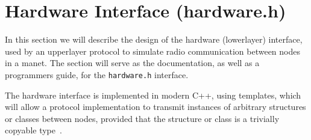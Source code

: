 
\section{Hardware Interface (hardware.h)}\label{sec:hardwareinterface}
In this section we will describe the design of the hardware (\gls{lowerlayer}) interface, used by an \gls{upperlayer} protocol to simulate radio communication between nodes in a \gls{manet}. The section will serve as the documentation, as well as a programmers guide, for the \texttt{hardware.h} interface.\medbreak

The hardware interface is implemented in modern C++, using templates, which will allow a protocol implementation to transmit instances of arbitrary structures or classes between nodes, provided that the structure or class is a trivially copyable type~\cite{website:cpptriviallycopyable}.

